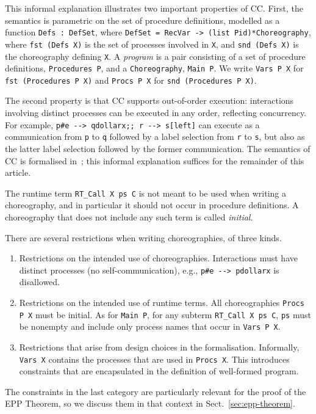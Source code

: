 \documentclass[runningheads]{llncs}
\begin{document}
This informal explanation illustrates two important properties of CC.
First, the semantics is parametric on the set of procedure definitions, modelled as a function \lstinline+Defs : DefSet+, where \lstinline+DefSet = RecVar -> (list Pid)*Choreography+, where \lstinline+fst (Defs X)+ is the set of processes involved in \lstinline+X+, and \lstinline+snd (Defs X)+ is the choreography defining \lstinline+X+.
A \emph{program} is a pair consisting of a set of procedure definitions, \lstinline+Procedures P+, and a \lstinline+Choreography+, \lstinline+Main P+.
We write \lstinline+Vars P X+ for \lstinline+fst (Procedures P X)+ and \lstinline+Procs P X+
for \lstinline+snd (Procedures P X)+.

The second property is that CC supports out-of-order execution: interactions involving distinct processes can be executed in any order, reflecting concurrency.
For example, \lstinline+p#e --> qdollarx;; r --> s[left]+ can execute as a
communication from \lstinline+p+ to \lstinline+q+ followed by a label selection from \lstinline+r+
to \lstinline+s+, but also as the latter label selection followed by the former communication.
The semantics of CC is formalised in~\cite{CMP21}; this informal explanation suffices for the remainder of this article.

The runtime term \lstinline+RT_Call X ps C+ is not meant to be used when writing a choreography, and
in particular it should not occur in procedure definitions.
A choreography that does not include any such term is called \emph{initial}.

There are several restrictions when writing choreographies, of three kinds.
\begin{enumerate}[nosep,noitemsep,label={(\roman{*})}]
\item Restrictions on the intended use of choreographies.
  Interactions must have distinct processes (no self-communication), e.g., 
  \lstinline+p#e --> pdollarx+ is disallowed.

\item Restrictions on the intended use of runtime terms.
  All choreographies \lstinline+Procs P X+ must be initial.
  As for \lstinline+Main P+, for any subterm \lstinline+RT_Call X ps C+,
  \lstinline+ps+ must be nonempty and include only process names that occur in
  \lstinline+Vars P X+.

\item Restrictions that arise from design choices in the formalisation.
  Informally, \lstinline+Vars X+ contains the processes that are used in \lstinline+Procs X+.
  This introduces constraints that are encapsulated in the definition of well-formed
  program.
\end{enumerate}
The constraints in the last category are particularly relevant for the proof of the EPP Theorem, so we discuss them in that context in Sect.~\ref{sec:epp-theorem}.
\end{document}
